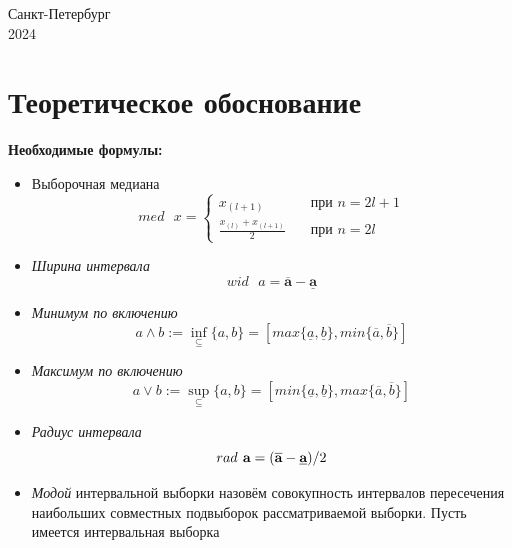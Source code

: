 \documentclass[10pt]{article}
\begin{document}
\begin{titlepage}
\vspace{\fill}

\begin{center}

Санкт-Петербург \\2024

\end{center}

\end{titlepage}

\tableofcontents\newpage

\section{Теоретическое обоснование}
\textbf{Необходимые формулы:}
\begin{itemize}
\item Выборочная медиана
 \begin{equation*}
 med \text{ } x=\begin{cases} 
    x_{(l+1)}      & \quad \text{при } n = 2l+1 \\
    \frac{x_{(l)}+x_{(l+1)}}{2} & \quad \text{при } n = 2l 
  \end{cases}
 \end{equation*}
    \item \textit{Ширина интервала}
    \begin{equation*}
    wid \textbf{ }a=\overline{\textbf{a}}-\underline{\mathbf{a}}
    \end{equation*}
 \item \textit{Минимум по включению}
    \begin{equation*}
    a \wedge b := \inf_{\subseteq} \{a,b\} = [max\{\underline{a},\underline{b}\}, min \{\overline{a},\overline{b}\}]
    \end{equation*}
    \item \textit{Максимум по включению}
    \begin{equation*}
    a \vee b := \sup_{\subseteq} \{a,b\} = [min\{\underline{a},\underline{b}\}, max \{\overline{a},\overline{b}\}]
    \end{equation*}
    \item \textit{Радиус интервала}
    \begin{equation*}
 rad \textbf{ a}=(\overline{\textbf{a}}-\textbf{\underline{a}})/2
 \end{equation*}
 \item \textit{Модой} интервальной выборки назовём совокупность интервалов пересечения наибольших совместных подвыборок рассматриваемой выборки.
 Пусть имеется интервальная выборка


\end{itemize}
\end{document}
